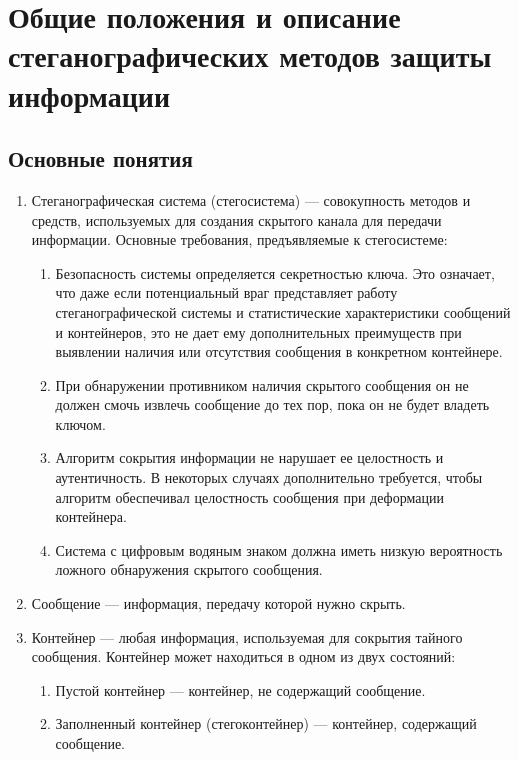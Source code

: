 \chapter{Общие положения и описание стеганографических методов защиты информации} %

\section{Основные понятия}

\begin{enumerate}
    \item Стеганографическая система (стегосистема) --- совокупность методов и средств,
    используемых для создания скрытого канала для передачи информации.
    Основные требования, предъявляемые к стегосистеме:
    \begin{enumerate}
        \item Безопасность системы определяется секретностью ключа.
        Это означает, что даже если потенциальный враг представляет работу стеганографической системы
        и статистические характеристики сообщений и контейнеров,
        это не дает ему дополнительных преимуществ при выявлении
        наличия или отсутствия сообщения в конкретном контейнере.
        \item При обнаружении противником наличия скрытого сообщения
        он не должен смочь извлечь сообщение до тех пор, пока он не будет владеть ключом.
        \item Алгоритм сокрытия информации не нарушает ее целостность и аутентичность.
        В некоторых случаях дополнительно требуется,
        чтобы алгоритм обеспечивал целостность сообщения при деформации контейнера.
        \item Система с цифровым водяным знаком должна иметь низкую вероятность ложного обнаружения скрытого сообщения.
    \end{enumerate}
    \item Сообщение --- информация, передачу которой нужно скрыть.
    \item Контейнер --- любая информация,
    используемая для сокрытия тайного сообщения. Контейнер может находиться в одном из двух состояний:
    \begin{enumerate}
        \item Пустой контейнер --- контейнер, не содержащий сообщение.
        \item Заполненный контейнер (стегоконтейнер) --- контейнер, содержащий сообщение.

\end{enumerate}
\end{enumerate}

